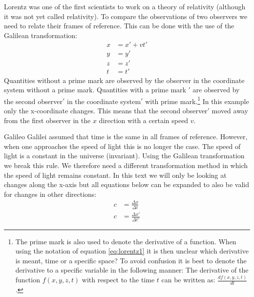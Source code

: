 Lorentz was one of the first scientists to work on a theory of relativity (although it was not yet called relativity). To compare the observations of two observers we need to relate their frames of reference. This can be done with the use of the Galilean transformation:
\begin{equation}\label{eq:lorentz1}\begin{aligned}
x &= x' + vt' \\
y &= y' \\
z &= z' \\
t &= t'
\end{aligned}\end{equation}
Quantities without a prime mark are observed by the observer in the coordinate system without a prime mark. Quantities with a prime mark $'$ are observed by the second observer$'$ in the coordinate system$'$ with prime mark.\footnote{The prime mark is also used to denote the derivative of a function. When using the notation of equation \ref{eq:lorentz1} it is then unclear which derivative is meant, time or a specific space? To avoid confusion it is best to denote the derivative to a specific variable in the following manner: The derivative of the function $f(x,y,z,t)$ with respect to the time $t$ can be written as: $\frac{df(x,y,z,t)}{dt}$.}
In this example only the x-coordinate changes. This means that the second observer$'$ moved away from the first observer in the $x$ direction with a certain speed $v$.

Galileo Galilei assumed that time is the same in all frames of reference. However, when one approaches the speed of light this is no longer the case. The speed of light is a constant in the universe (invariant). Using the Galilean transformation we break this rule. We therefore need a different transformation method in which the speed of light remains constant. In this text we will only be looking at changes along the x-axis but all equations below can be expanded to also be valid for changes in other directions:
\begin{equation}\label{eq:lorentz2} \begin{aligned}
c &= \frac{\Delta x}{\Delta t} \\
c &= \frac{\Delta x'}{\Delta t'}
\end{aligned}\end{equation}

